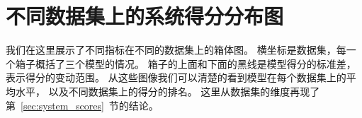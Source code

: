 
\chapter{不同数据集上的系统得分分布图}\label{ch:dataset_system_dist}
我们在这里展示了不同指标在不同的数据集上的箱体图。
横坐标是数据集，每一个箱子概括了三个模型的情况。
箱子的上面和下面的黑线是模型得分的标准差，表示得分的变动范围。
从这些图像我们可以清楚的看到模型在每个数据集上的平均水平，
以及不同数据集上的得分的排名。
这里从数据集的维度再现了第~\ref{sec:system_scores}~节的结论。





